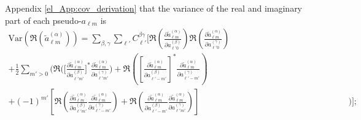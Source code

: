 Appendix \ref{el_App:cov_derivation}
that the variance of the real and imaginary part of each pseudo-$a_{\ell m}$ is
\begin{equation}
\begin{split}
\mathrm{Var} \left(
\Re \left( \widetilde{a}_{\ell m}^{ \left( \alpha \right) } \right)
\right) =
\sum_{\beta, \gamma}
\sum_{\ell'}
C_{\ell'}^{\beta \gamma}
\Bigg[
\Re \left(
\frac{\partial \widetilde{a}_{\ell m}^{ \left( \alpha \right) }}
{\partial a_{\ell' 0}^{ \left( \beta \right) }}
\right)
\Re \left(
\frac{\partial \widetilde{a}_{\ell m}^{ \left( \alpha \right) }}
{\partial a_{\ell' 0}^{ \left( \gamma \right) }}
\right)
\qquad\qquad\qquad\qquad\qquad\qquad\quad & \\
+ \frac{1}{2}
\sum_{m' > 0} \Bigg(
\Re \Bigg(
\Bigg[
\frac{\partial \widetilde{a}_{\ell m}^{ \left( \alpha \right) }}
{\partial a_{\ell' m'}^{ \left( \beta \right) }}
\Bigg]^*
\frac{\partial \widetilde{a}_{\ell m}^{ \left( \alpha \right) }}
{\partial a_{\ell' m'}^{ \left( \gamma \right) }}
\Bigg)
+ \Re \left(
\left[
\frac{\partial \widetilde{a}_{\ell m}^{ \left( \alpha \right) }}
{\partial a_{\ell' -m'}^{ \left( \beta \right) }}
\right]^*
\frac{\partial \widetilde{a}_{\ell m}^{ \left( \alpha \right) }}
{\partial a_{\ell' -m'}^{ \left( \gamma \right) }}
\right)& \\
+
\left( -1 \right)^{m'} \left[
\Re \left(
\frac{\partial \widetilde{a}_{\ell m}^{ \left( \alpha \right) }}
{\partial a_{\ell' m'}^{ \left( \beta \right) }}
\frac{\partial \widetilde{a}_{\ell m}^{ \left( \alpha \right) }}
{\partial a_{\ell' -m'}^{ \left( \gamma \right) }}
\right)
+ \Re \left(
\frac{\partial \widetilde{a}_{\ell m}^{ \left( \alpha \right) }}
{\partial a_{\ell' -m'}^{ \left( \beta \right) }}
\frac{\partial \widetilde{a}_{\ell m}^{ \left( \alpha \right) }}
{\partial a_{\ell' m'}^{ \left( \gamma \right) }}
\right) \right]&
\Bigg) \Bigg];
\label{el_Eqn:re_alm_variance}
\end{split}
\end{equation}
